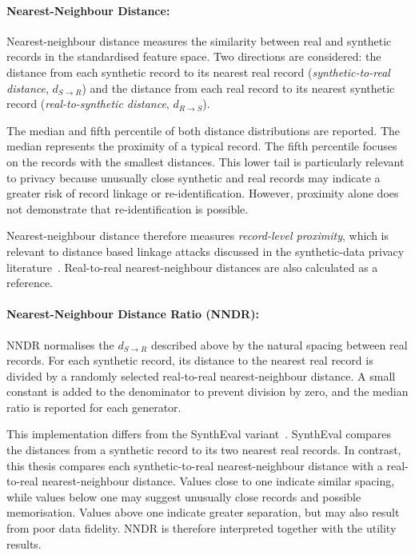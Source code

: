 \paragraph{Nearest-Neighbour Distance:}
\label{sec:eval:privacy:nn}

Nearest-neighbour distance measures the similarity between real and
synthetic records in the standardised feature space. 
Two directions are considered: the distance from each synthetic
record to its nearest real record
(\emph{synthetic-to-real distance}, $d_{S\to R}$) and the distance from
each real record to its nearest synthetic record
(\emph{real-to-synthetic distance}, $d_{R\to S}$).

The median and fifth percentile of both distance distributions are
reported. The median represents the proximity of a typical record.
The fifth percentile focuses on the records with the smallest
distances. This lower tail is particularly relevant to privacy because
unusually close synthetic and real records may indicate a greater risk
of record linkage or re-identification. However, proximity alone does
not demonstrate that re-identification is possible.

Nearest-neighbour distance therefore measures
\emph{record-level proximity}, which is relevant to distance based
linkage attacks discussed in the synthetic-data privacy
literature~\cite{hernandez2022synthetic,goncalves2020generation,wang2019generating}.
Real-to-real nearest-neighbour distances are also calculated as a
reference. 

\paragraph{Nearest-Neighbour Distance Ratio (NNDR):}
\label{sec:eval:privacy:nndr}
NNDR normalises the $d_{S\to R}$
described above by the natural spacing between real records. For each
synthetic record, its distance to the nearest real record is divided by
a randomly selected real-to-real nearest-neighbour distance. A small
constant is added to the denominator to prevent division by zero, and
the median ratio is reported for each generator.

This implementation differs from the SynthEval
variant~\cite{lautrup2025syntheval}. SynthEval compares the distances
from a synthetic record to its two nearest real records. In contrast, 
this thesis compares each synthetic-to-real
nearest-neighbour distance with a real-to-real
nearest-neighbour distance. Values close to one indicate
similar spacing, while values below one may suggest unusually close
records and possible memorisation. Values above one indicate greater
separation, but may also result from poor data fidelity. NNDR is
therefore interpreted together with the utility results.

